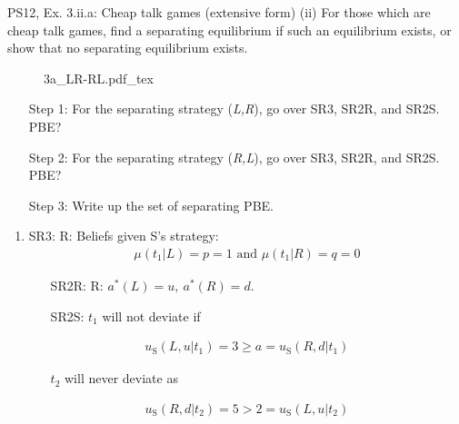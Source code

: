 \begin{frame}{PS12, Ex. 3.ii.a: Cheap talk games (extensive form)}
    (ii) For those which are cheap talk games, find a separating equilibrium if such an equilibrium exists, or show that no separating equilibrium exists.\vspace{-10pt}
    \begin{multicols}{2}
      \begin{figure}[!h]
        \center{}
        {3a_LR-RL.pdf_tex}
      \end{figure}\vspace{-6pt}
      \begin{itemize}
        \item[Step 1:] For the separating strategy (\textit{L,R}), go over SR3, SR2R, and SR2S. PBE?
        \item[Step 2:] For the separating strategy (\textit{R,L}), go over SR3, SR2R, and SR2S. PBE?
        \item[Step 3:] Write up the set of separating PBE.
      \end{itemize}
      \vfill\null\columnbreak
      \begin{enumerate}
        \item SR3: R: Beliefs given S's strategy:\vspace{-8pt}
        \begin{align*}
          \mu(t_1|L)=p=1\text{ and }\mu(t_1|R)=q=0
        \end{align*}\vspace{-18pt}
        \begin{itemize}\normalsize
          \item[SR2R:] R: $a^*(L)=u,\ a^*(R)=d$.
          \item[SR2S:] $t_1$ will not deviate if
        \end{itemize}\vspace{-10pt}
        \begin{align*}
          u_\text{S}(L,u|t_1)=3\geq a=u_\text{S}(R,d|t_1)
        \end{align*}\vspace{-18pt}
        \begin{itemize}\normalsize
          \item[] $t_2$ will never deviate as
        \end{itemize}\vspace{-10pt}
        \begin{align*}
          u_\text{S}(R,d|t_2)=5>2=u_\text{S}(L,u|t_2)

\end{align*}
\end{enumerate}
\end{multicols}
\end{frame}
